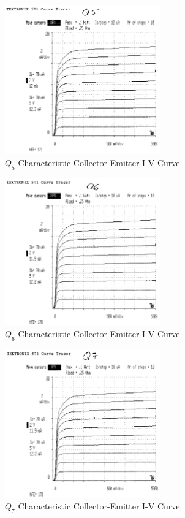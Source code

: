 \documentclass[titlepage, letterpaper, 10.5pt]{article}
\begin{document}
\begin{figure}[ht]
	\centering
	\includegraphics[width=0.6\textwidth]{results/q5-characteristics}
	\caption{$Q_{5}$ Characteristic Collector-Emitter I-V Curve}
\end{figure}

\begin{figure}[ht]
	\centering
	\includegraphics[width=0.6\textwidth]{results/q6-characteristics}
	\caption{$Q_{6}$ Characteristic Collector-Emitter I-V Curve}
\end{figure}

\begin{figure}[ht]
	\centering
	\includegraphics[width=0.6\textwidth]{results/q7-characteristics}
	\caption{$Q_{7}$ Characteristic Collector-Emitter I-V Curve}
\end{figure}
\end{document}
